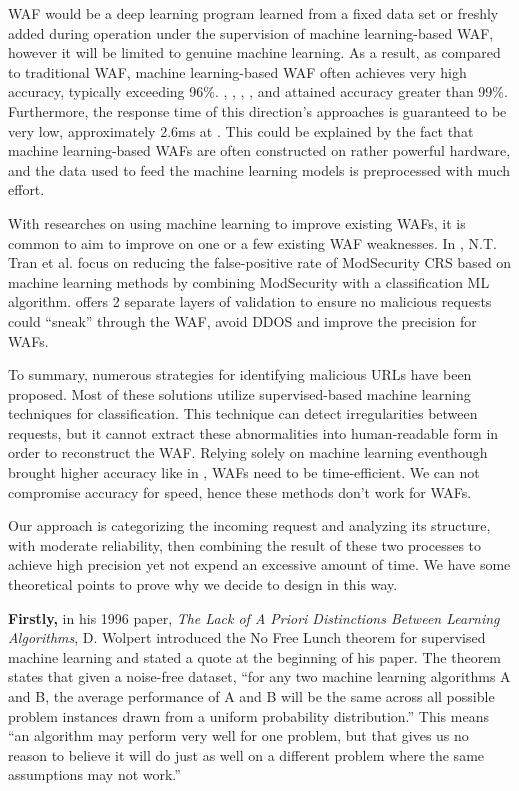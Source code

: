 WAF would be a deep learning program learned from a fixed data set or freshly added during operation under the supervision of machine learning-based WAF, however it will be limited to genuine machine learning. As a result, as compared to traditional WAF, machine learning-based WAF often achieves very high accuracy, typically exceeding 96\%. \cite{Jemal}, \cite{Toprak}, \cite{Gogoi}, \cite{Devi}, and \cite{Alshammari} attained accuracy greater than 99\%. Furthermore, the response time of this direction's approaches is guaranteed to be very low, approximately 2.6ms at \cite{Jemal}. This could be explained by the fact that machine learning-based WAFs are often constructed on rather powerful hardware, and the data used to feed the machine learning models is preprocessed with much effort.

With researches on using machine learning to improve existing WAFs, it is common to aim to improve on one or a few existing WAF weaknesses. In \cite{Tin}, N.T. Tran et al. focus on reducing the false-positive rate of ModSecurity CRS based on machine learning methods by combining ModSecurity with a classification ML algorithm. \cite{Dawadi} offers 2 separate layers of validation to ensure no malicious requests could “sneak” through the WAF, avoid DDOS and improve the precision for WAFs.
 
To summary, numerous strategies for identifying malicious URLs have been proposed. Most of these solutions utilize supervised-based machine learning techniques for classification. This technique can detect irregularities between requests, but it cannot extract these abnormalities into human-readable form in order to reconstruct the WAF. Relying solely on machine learning eventhough brought higher accuracy like in \cite{s22093373}, WAFs need to be time-efficient. We can not compromise accuracy for speed, hence these methods don't work for WAFs.

Our approach is categorizing the incoming request and analyzing its structure, with moderate reliability, then combining the result of these two processes to achieve high precision yet not expend an excessive amount of time.
\newpage
We have some theoretical points to prove why we decide to design in this way.

\textbf{Firstly,} in his 1996 paper, \emph{The Lack of A Priori Distinctions Between Learning Algorithms}, D. Wolpert \cite{wolpert} introduced the No Free Lunch theorem for supervised machine learning and stated a quote at the beginning of his paper. The theorem states that given a noise-free dataset, “for any two machine learning algorithms A and B, the average performance of A and B will be the same across all possible problem instances drawn from a uniform probability distribution.” This means  “an algorithm may perform very well for one problem, but that gives us no reason to believe it will do just as well on a different problem where the same assumptions may not work.”

